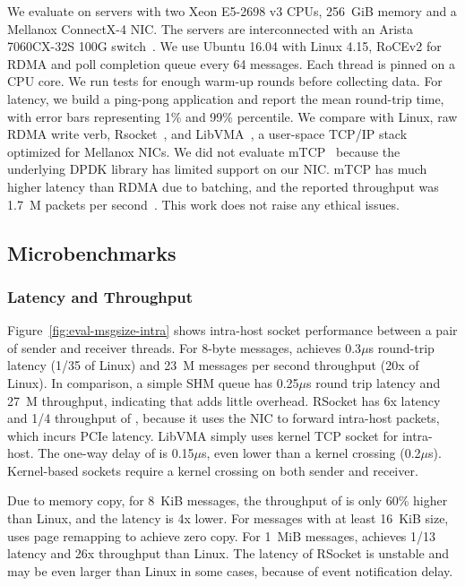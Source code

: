 We evaluate \sys on servers with two Xeon E5-2698 v3 CPUs, 256~GiB memory and a Mellanox ConnectX-4 NIC. The servers are interconnected with an Arista 7060CX-32S 100G switch~\cite{arista-7060cx}. We use Ubuntu 16.04 with Linux 4.15, RoCEv2 for RDMA and poll completion queue every 64 messages.
Each thread is pinned on a CPU core. We run tests for enough warm-up rounds before collecting data.
For latency, we build a ping-pong application and report the mean round-trip time, with error bars representing 1\% and 99\% percentile.
We compare with Linux, raw RDMA write verb, Rsocket~\cite{rsockets}, and LibVMA~\cite{libvma}, a user-space TCP/IP stack optimized for Mellanox NICs.
We did not evaluate mTCP~\cite{jeong2014mtcp} because the underlying DPDK library has limited support on our NIC. mTCP has much higher latency than RDMA due to batching, and the reported throughput was 1.7~M packets per second~\cite{kalia2018datacenter}. %
This work does not raise any ethical issues.

\subsection{Microbenchmarks}
\label{subsec:microbenchmark}

\subsubsection{Latency and Throughput}
\quad



Figure~\ref{fig:eval-msgsize-intra} shows intra-host socket performance between a pair of sender and receiver threads.
For 8-byte messages, \sys achieves 0.3$\mu$s round-trip latency (1/35 of Linux) and 23~M messages per second throughput (20x of Linux).
In comparison, a simple SHM queue has 0.25$\mu$s round trip latency and 27~M throughput, indicating that \sys adds little overhead.
RSocket has 6x latency and 1/4 throughput of \sys{}, because it uses the NIC to forward intra-host packets, which incurs PCIe latency.
LibVMA simply uses kernel TCP socket for intra-host.
The one-way delay of \sys{} is 0.15$\mu$s, even lower than a kernel crossing (0.2$\mu$s). Kernel-based sockets require a kernel crossing on both sender and receiver.

Due to memory copy, for 8~KiB messages, the throughput of \sys is only 60\% higher than Linux, and the latency is 4x lower. For messages with at least 16~KiB size, \sys uses page remapping to achieve zero copy.
For 1~MiB messages, \sys achieves 1/13 latency and 26x throughput than Linux.
The latency of RSocket is unstable and may be even larger than Linux in some cases, because of event notification delay.


